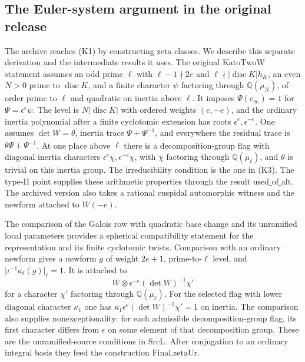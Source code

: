 \subsection{The Euler-system argument in the original release}

The archive reaches (K1) by constructing zeta classes. We describe
this separate derivation and the intermediate results it uses.
The original \(\mathrm{KatoTwoW}\) statement assumes an odd prime
\(\ell\) with \(\ell-1\nmid 2e\) and
\(\ell\nmid |\operatorname{disc}K|h_K\), an even
\(N>0\) prime to \(\operatorname{disc}K\), and a finite character
\(\psi\) factoring through \(\mathbb Q(\mu_N)\), of order prime
to \(\ell\) and quadratic on inertia above \(\ell\).
It imposes \(\Psi(c_\infty)=1\) for \(\Psi=\epsilon^e\psi\).
The level is \(N|\operatorname{disc}K|\) with ordered weights
\((e,-e)\), and the ordinary inertia polynomial after a finite
cyclotomic extension has roots \(\epsilon^e,\epsilon^{-e}\).
One assumes \(\det W=\theta\), inertia trace
\(\Psi+\Psi^{-1}\), and everywhere the residual trace is
\(\overline{\theta\Psi+\Psi^{-1}}\). At one place above \(\ell\)
there is a decomposition-group flag with diagonal inertia characters
\(\epsilon^e\chi,\epsilon^{-e}\chi\), with \(\chi\) factoring through
\(\mathbb Q(\mu_\ell)\), and \(\theta\) is trivial on this inertia
group. The irreducibility condition is the one in (K3).
The type-II point supplies these arithmetic properties through
the result \(\mathrm{used\_of\_alt}\). The archived version also
takes a rational cuspidal automorphic witness and the newform
attached to \(W(-e)\).

The comparison of the Galois row with quadratic base change and
its unramified local parameters provides a spherical compatibility
statement for the representation and its finite cyclotomic twists.
Comparison with an ordinary newform gives a newform \(g\) of
weight \(2e+1\), prime-to-\(\ell\) level, and
\(\lvert\iota^{-1}a_\ell(g)\rvert_\ell=1\). It is attached to
\[
 W\otimes\epsilon^{-e}(\det W)^{-1}\chi'
\]
for a character \(\chi'\) factoring through \(\mathbb Q(\mu_\ell)\).
For the selected flag with lower diagonal character \(\kappa_1\)
one has \(\kappa_1\epsilon^e(\det W)^{-1}\chi'=1\) on inertia.
The comparison also supplies nonexceptionality: for each admissible
decomposition-group flag, its first character differs from \(\epsilon\)
on some element of that decomposition group. These are the
unramified-source conditions in \(\mathrm{SrcL}\). After conjugation
to an ordinary integral basis they feed the construction
\(\mathrm{Final.zetaUr}\).

